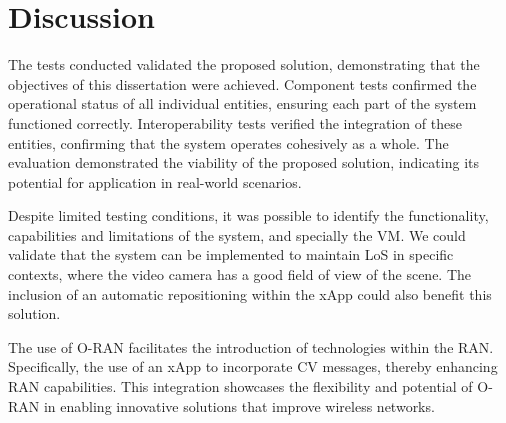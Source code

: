 


\section{Discussion}\label{sec:discuss}
The tests conducted validated the proposed solution, demonstrating that the objectives of this dissertation were achieved.
Component tests confirmed the operational status of all individual entities, ensuring each part of the system functioned correctly.
Interoperability tests verified the integration of these entities, confirming that the system operates cohesively as a whole.
The evaluation demonstrated the viability of the proposed solution, indicating its potential for application in real-world scenarios.

Despite limited testing conditions, it was possible to identify the functionality, capabilities and limitations of the system, and specially the VM\@.
We could validate that the system can be implemented to maintain LoS in specific contexts, where the video camera has a good field of view of the scene.
The inclusion of an automatic repositioning within the xApp could also benefit this solution.

The use of O-RAN facilitates the introduction of technologies within the RAN\@.
Specifically, the use of an xApp to incorporate CV messages, thereby enhancing RAN capabilities.
This integration showcases the flexibility and potential of O-RAN in enabling innovative solutions that improve wireless networks.


